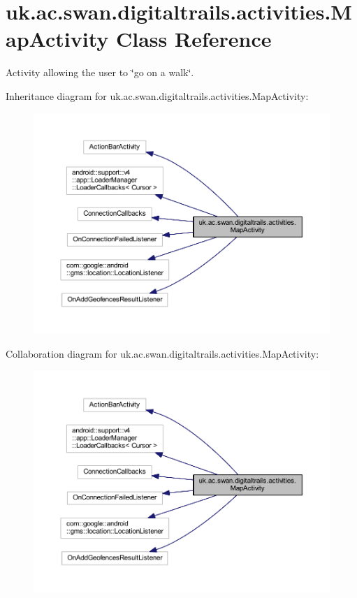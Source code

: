 \hypertarget{classuk_1_1ac_1_1swan_1_1digitaltrails_1_1activities_1_1_map_activity}{\section{uk.\+ac.\+swan.\+digitaltrails.\+activities.\+Map\+Activity Class Reference}
\label{classuk_1_1ac_1_1swan_1_1digitaltrails_1_1activities_1_1_map_activity}
}


Activity allowing the user to \char`\"{}go on a walk\char`\"{}.  




Inheritance diagram for uk.\+ac.\+swan.\+digitaltrails.\+activities.\+Map\+Activity\+:\nopagebreak
\begin{figure}[H]
\begin{center}
\leavevmode
\includegraphics[width=350pt]{classuk_1_1ac_1_1swan_1_1digitaltrails_1_1activities_1_1_map_activity__inherit__graph}
\end{center}
\end{figure}


Collaboration diagram for uk.\+ac.\+swan.\+digitaltrails.\+activities.\+Map\+Activity\+:\nopagebreak
\begin{figure}[H]
\begin{center}
\leavevmode
\includegraphics[width=350pt]{classuk_1_1ac_1_1swan_1_1digitaltrails_1_1activities_1_1_map_activity__coll__graph}
\end{center}
\end{figure}
